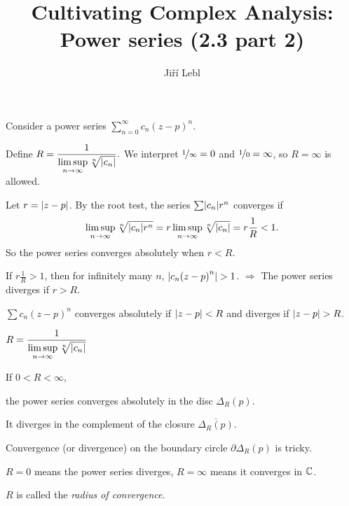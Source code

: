 \documentclass[10pt,aspectratio=169]{beamer}
\author{Ji\v{r}\'i Lebl}
\institute[OSU]{%
Departemento pri Matematiko de Oklahoma {\^S}tata Universitato}
\title{Cultivating Complex Analysis:\\%
Power series (2.3 part 2)}
\date{}
\begin{document}
\begin{frame}
\titlepage
\end{frame}

\begin{frame}
Consider a power series
\quad $\displaystyle
\sum_{n=0}^\infty c_n {(z-p)}^n .
$

\medskip
\pause

Define
\quad
$\displaystyle
R = \frac{1}{\limsup\limits_{n \to \infty} \sqrt[n]{\lvert {c_n} \rvert}} .
$
\quad
We interpret $\nicefrac{1}{\infty} = 0$ and $\nicefrac{1}{0} = \infty$,
so $R=\infty$ is allowed.

\medskip
\pause

Let $r=\left\lvert {z-p} \right\rvert$.
By the root test, the series $\sum \lvert {c_n} \rvert r^n$ converges if
\[
\limsup_{n \to \infty} \sqrt[n]{\lvert {c_n} \rvert r^n} = 
r \limsup_{n \to \infty} \sqrt[n]{\lvert {c_n} \rvert} = r \frac{1}{R} < 1 .
\]
\pause
So the power series converges absolutely when $r < R$.

\medskip
\pause

If $r \frac{1}{R} > 1$, then for infinitely many $n$,
$\lvert {c_n {(z-p)}^n} \rvert > 1$.  $\Rightarrow$ The power series diverges
if $r > R$.

\pause


\begin{proposition}
$\sum c_n {(z-p)}^n$ converges absolutely if
$\lvert {z-p} \rvert < R$ and diverges if
$\lvert {z-p} \rvert > R$.
\end{proposition}

\end{frame}

\begin{frame}
$\displaystyle
R = \frac{1}{\limsup\limits_{n \to \infty} \sqrt[n]{\lvert {c_n} \rvert}}
$

\vspace*{-0.7in}
\hspace*{2in}%

\vspace*{-0.1in}

If $0 < R < \infty$,

the power series converges absolutely
in the disc $\Delta_R(p)$.

\medskip
\pause

It diverges in the complement of the closure $\overline{\Delta_R(p)}$.

\medskip
\pause

Convergence (or divergence) on the boundary circle $\partial \Delta_R(p)$
is tricky.

\medskip
\pause

$R=0$ means the power series diverges, $R=\infty$ means it converges in
${\mathbb{C}}$.

\medskip
\pause

$R$ is called the \emph{radius of convergence}.
\end{frame}
\end{document}
